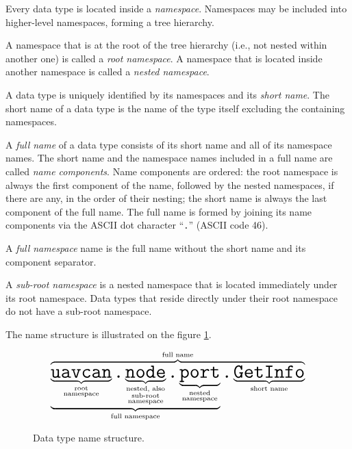 Every data type is located inside a \emph{namespace}.
Namespaces may be included into higher-level namespaces, forming a tree hierarchy.

A namespace that is at the root of the tree hierarchy (i.e., not nested within another one)
is called a \emph{root namespace}.
A namespace that is located inside another namespace is called a \emph{nested namespace}.

A data type is uniquely identified by its namespaces and its \emph{short name}.
The short name of a data type is the name of the type itself excluding the containing namespaces.

A \emph{full name} of a data type consists of its short name and all of its namespace names.
The short name and the namespace names included in a full name are called \emph{name components}.
Name components are ordered: the root namespace is always the first component of the name,
followed by the nested namespaces, if there are any, in the order of their nesting;
the short name is always the last component of the full name.
The full name is formed by joining its name components via the ASCII dot character ``\verb|.|'' (ASCII code 46).

A \emph{full namespace} name is the full name without the short name and its component separator.

A \emph{sub-root namespace} is a nested namespace that is located immediately under its root namespace.
Data types that reside directly under their root namespace do not have a sub-root namespace.

The name structure is illustrated on the figure \ref{fig:dsdl_data_type_name_structure}.

\begin{figure}[H]
    $$
    \overbrace{
        \underbrace{
            \underbrace{\texttt{\huge{uavcan}}}_{\substack{\text{root} \\ \text{namespace}}}%
            \texttt{\huge{.}}%
            \underbrace{\texttt{\huge{node}}}_{\substack{\text{nested, also} \\ \text{sub-root} \\ \text{namespace}}}%
            \texttt{\huge{.}}%
            \underbrace{\texttt{\huge{port}}}_{\substack{\text{nested} \\ \text{namespace}}}%
        }_{\text{full namespace}}%
        \texttt{\huge{.}}%
        \underbrace{\texttt{\huge{GetInfo}}}_{\text{short name}}
    }^{\text{full name}}
    $$
    \caption{Data type name structure.\label{fig:dsdl_data_type_name_structure}}
\end{figure}

